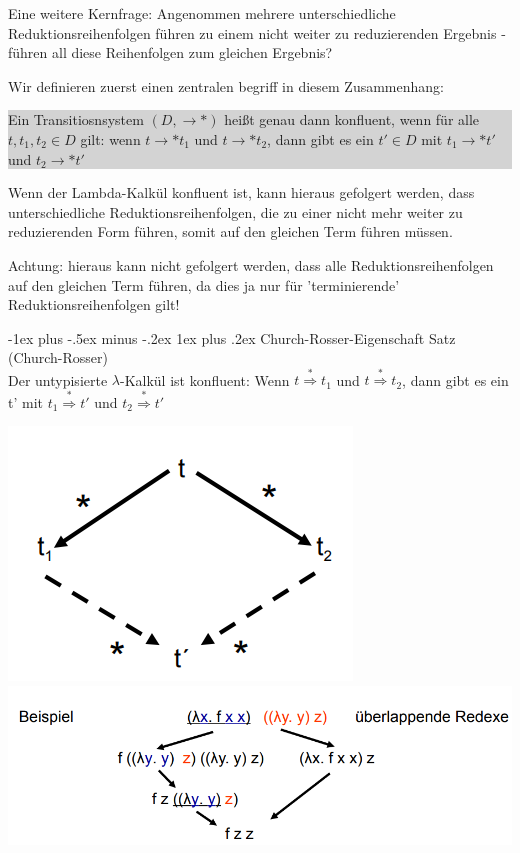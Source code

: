 \documentclass[10pt]{article}
\makeatletter
\renewcommand{\subsubsection}{\@startsection{subsubsection}{3}{0mm}%
                                {-1ex plus -.5ex minus -.2ex}%
                                {1ex plus .2ex}%
                                {\normalfont\small\bfseries}}
\makeatother
\begin{document}
\begin{itemize*}
\begin{itemize*}
    \end{itemize*}
    \item Eine weitere Kernfrage: Angenommen mehrere unterschiedliche Reduktionsreihenfolgen führen zu einem nicht weiter zu reduzierenden Ergebnis - \color{blue} führen all diese Reihenfolgen zum gleichen Ergebnis? \color{black}
    \item Wir definieren zuerst einen zentralen begriff in diesem Zusammenhang:
    \colorbox{lightgray}{\begin{minipage}[h]{.9\linewidth}
        Ein Transitiosnsystem $(D,\rightarrow*)$ heißt genau dann konfluent, wenn für alle $t,t_1,t_2 \in D$ gilt: wenn  $ t \rightarrow* t_1$ und $t \rightarrow* t_2$, dann gibt es ein $t' \in D$ mit $t_1 \rightarrow* t'$ und $t_2 \rightarrow* t'$
      \end{minipage}}
    \item Wenn der Lambda-Kalkül konfluent ist, kann hieraus gefolgert werden, dass unterschiedliche Reduktionsreihenfolgen, die zu einer nicht mehr weiter zu reduzierenden Form führen, somit auf den gleichen Term führen müssen.
    \item Achtung: hieraus kann nicht gefolgert werden, dass alle Reduktionsreihenfolgen auf den gleichen Term führen, da dies ja nur für 'terminierende' Reduktionsreihenfolgen gilt!
  \end{itemize*}
  
  \subsubsection{Church-Rosser-Eigenschaft}
  \color{blue} Satz (Church-Rosser) \\
  Der untypisierte $\lambda$-Kalkül ist konfluent: Wenn $t \stackrel{*}{\Rightarrow} t_1$ und $t \stackrel{*}{\Rightarrow} t_2$, dann gibt es ein t' mit $t_1 \stackrel{*}{\Rightarrow} t'$ und $t_2 \stackrel{*}{\Rightarrow} t'$
  \color{black}
  
  \begin{center}
    \includegraphics[width=0.25\linewidth]{Assets/Programmierparadigmen-diamant-eigenschaft.png}
    \includegraphics[width=0.25\linewidth]{Assets/Programmierparadigmen-diamant-beispiel}
  \end{center}
  
\end{document}

